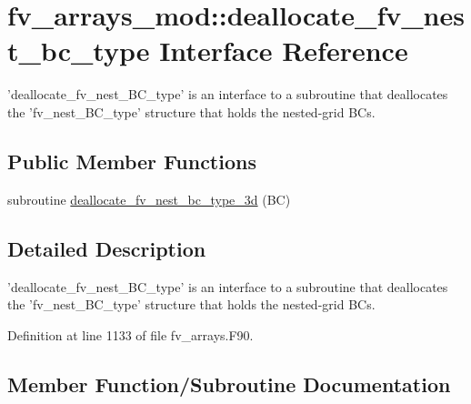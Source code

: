 \section{fv\-\_\-arrays\-\_\-mod\-:\-:deallocate\-\_\-fv\-\_\-nest\-\_\-bc\-\_\-type Interface Reference}
\label{interfacefv__arrays__mod_1_1deallocate__fv__nest__bc__type}


'deallocate\-\_\-fv\-\_\-nest\-\_\-\-B\-C\-\_\-type' is an interface to a subroutine that deallocates the 'fv\-\_\-nest\-\_\-\-B\-C\-\_\-type' structure that holds the nested-\/grid B\-Cs.  


\subsection*{Public Member Functions}
\begin{DoxyCompactItemize}
\item 
subroutine \hyperlink{interfacefv__arrays__mod_1_1deallocate__fv__nest__bc__type_aacc2b9cda1ed8ee21dc526d171682967}{deallocate\-\_\-fv\-\_\-nest\-\_\-bc\-\_\-type\-\_\-3d} (B\-C)
\end{DoxyCompactItemize}


\subsection{Detailed Description}
'deallocate\-\_\-fv\-\_\-nest\-\_\-\-B\-C\-\_\-type' is an interface to a subroutine that deallocates the 'fv\-\_\-nest\-\_\-\-B\-C\-\_\-type' structure that holds the nested-\/grid B\-Cs. 

Definition at line 1133 of file fv\-\_\-arrays.\-F90.



\subsection{Member Function/\-Subroutine Documentation}
